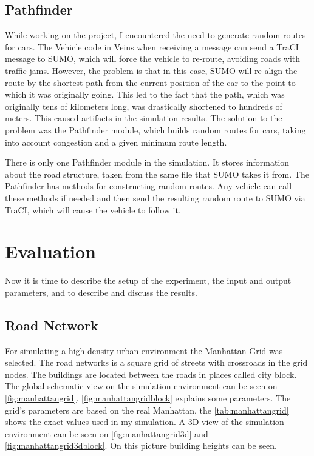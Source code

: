 \documentclass[]{nsm-thesis}
\begin{document}
\section{Pathfinder}

While working on the project, I encountered the need to generate random routes for cars. The Vehicle code in Veins when receiving a message can send a TraCI message to SUMO, which will force the vehicle to re-route, avoiding roads with traffic jams. However, the problem is that in this case, SUMO will re-align the route by the shortest path from the current position of the car to the point to which it was originally going. This led to the fact that the path, which was originally tens of kilometers long, was drastically shortened to hundreds of meters. This caused artifacts in the simulation results. The solution to the problem was the Pathfinder module, which builds random routes for cars, taking into account congestion and a given minimum route length.

There is only one Pathfinder module in the simulation. It stores information about the road structure, taken from the same file that SUMO takes it from. The Pathfinder has methods for constructing random routes. Any vehicle can call these methods if needed and then send the resulting random route to SUMO via TraCI, which will cause the vehicle to follow it.

\chapter{Evaluation}

Now it is time to describe the setup of the experiment, the input and output parameters, and to describe and discuss the results.

\section{Road Network}

For simulating a high-density urban environment the Manhattan Grid was selected. The road networks is a square grid of streets with crossroads in the grid nodes. The buildings are located between the roads in places called city block. The global schematic view on the simulation environment can be seen on \cref{fig:manhattangrid}. \cref{fig:manhattangridblock} explains some parameters. The grid's parameters are based on the real Manhattan, the \cref{tab:manhattangrid} shows the exact values used in my simulation. A 3D view of the simulation environment can be seen on \cref{fig:manhattangrid3d} and \cref{fig:manhattangrid3dblock}. On this picture building heights can be seen.
\end{document}

